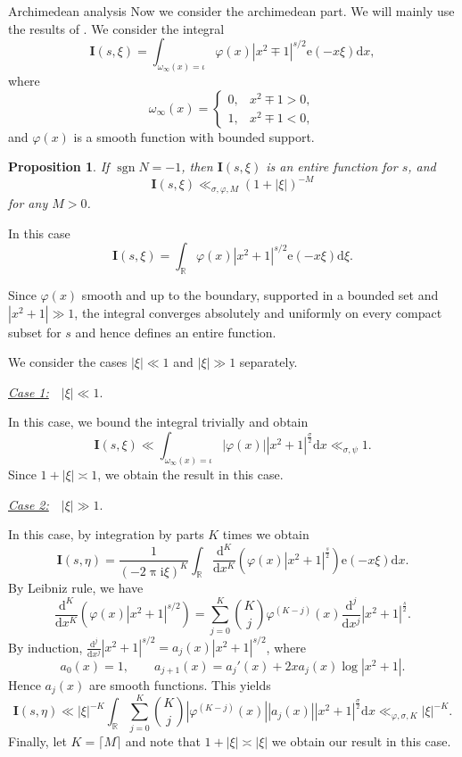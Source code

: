\documentclass[10pt,oneside,reqno]{amsart}
\makeatletter
\newcommand\rmd{\mathrm{d}}
\newcommand\rme{\mathrm{e}}
\newcommand\rmi{\mathrm{i}}
\newcommand\bI{\mathbf{I}}
\newcommand\RR{\mathbb{R}}
\newcommand\dpii{2\uppi\rmi}
\DeclareMathOperator\sgn{sgn}
\def\subsection{\@startsection{subsection}{2}
  \z@{3pt\@plus0pt}{-.5em}%
  {\normalfont\bfseries}}
\theoremstyle{THEOREM}
\newtheorem{proposition}[theorem]{Proposition}
\theoremstyle{DEFINITION}
\theoremstyle{EXERCISE}
\numberwithin{equation}{section}
\renewenvironment{proof}[1][\proofname]{\par
  \vspace{-6pt}
  \pushQED{\qed}
  \normalfont \topsep6\p@\@plus6\p@\relax
  \trivlist
  \item[\hskip\labelsep\rmfamily\bfseries
    #1\@addpunct{:}]\ignorespaces
}{
  \popQED\endtrivlist\@endpefalse
  \vspace{-6pt}
}
\makeatother
\begin{document}
\subsection{Archimedean analysis}
Now we consider the archimedean part. We will mainly use the results of \cite[Appendix A]{altug2017}. We consider the integral
\begin{equation}\label{eq:archimedeanfourier}
\bI(s,\xi)=\int_{\omega_\infty(x)=\iota}\varphi(x)|x^2\mp 1|^{s/2} \rme(-x\xi)\rmd x,
\end{equation}
where 
\[
\omega_\infty(x)=\begin{cases}
             0, & x^2\mp 1>0, \\
             1, & x^2\mp 1<0,
           \end{cases}
\]
and $\varphi(x)$ is a smooth function with bounded support.
\begin{proposition}\label{prop:archimedeansmooth}
If $\sgn N=-1$, then $\bI(s,\xi)$ is an entire function for $s$, and
\[
\bI(s,\xi)\ll_{\sigma,\varphi,M} (1+|\xi|)^{-M}
\]
for any $M>0$.
\end{proposition}
\begin{proof}
In this case
\[
\bI(s,\xi)=\int_{\RR}\varphi(x)|x^2+1|^{s/2}\rme(-x\xi)\rmd \xi.
\]

Since $\varphi(x)$ smooth and up to the boundary, supported in a bounded set and $|x^2+1|\gg 1$, the integral converges absolutely and uniformly on every compact subset for $s$ and hence defines an entire function. 

We consider the cases $|\xi|\ll 1$ and $|\xi|\gg 1$ separately.

\underline{\emph{Case 1:}}\ \ $|\xi|\ll 1$.

In this case, we bound the integral trivially and obtain
\[
\bI(s,\xi)\ll\int_{\omega_\infty(x)=\iota}|\varphi(x)||x^2+1|^{\frac\sigma2}\rmd x\ll_{\sigma,\psi} 1.
\]
Since $1+|\xi|\asymp 1$, we obtain the result in this case.

\underline{\emph{Case 2:}}\ \ $|\xi|\gg 1$. 

In this case, by integration by parts $K$ times we obtain
\[
\bI(s,\eta)=\frac{1}{(-\dpii\xi)^K}\int_{\RR}\frac{\rmd^K}{\rmd x^K}\left(\varphi(x)|x^2+1|^{\frac s2}\right)\rme(-x\xi)\rmd x.
\]
By Leibniz rule, we have
\[
\frac{\rmd^K}{\rmd x^K}\left(\varphi(x)|x^2+1|^{s/2}\right)=\sum_{j=0}^{K}\binom{K}{j}\varphi^{(K-j)}(x) \frac{\rmd^j}{\rmd x^j}|x^2+1|^{\frac s2}.
\]
By induction, $\frac{\rmd^j}{\rmd x^j}|x^2+1|^{s/2}=a_j(x)|x^2+1|^{s/2}$, where 
\[
a_0(x)=1,\qquad a_{j+1}(x)=a_j'(x)+2xa_j(x)\log|x^2+1|.
\]
Hence $a_j(x)$ are smooth functions. This yields
\[
\bI(s,\eta)\ll |\xi|^{-K}\int_{\RR}\sum_{j=0}^{K}\binom{K}{j}|\varphi^{(K-j)}(x)||a_j(x)| |x^2+1|^{\frac\sigma2}\rmd x\ll_{\varphi,\sigma,K} |\xi|^{-K}.
\]
Finally, let $K=\lceil M\rceil$ and note that $1+|\xi|\asymp |\xi|$ we obtain our result in this case.
\end{proof}
\end{document}
